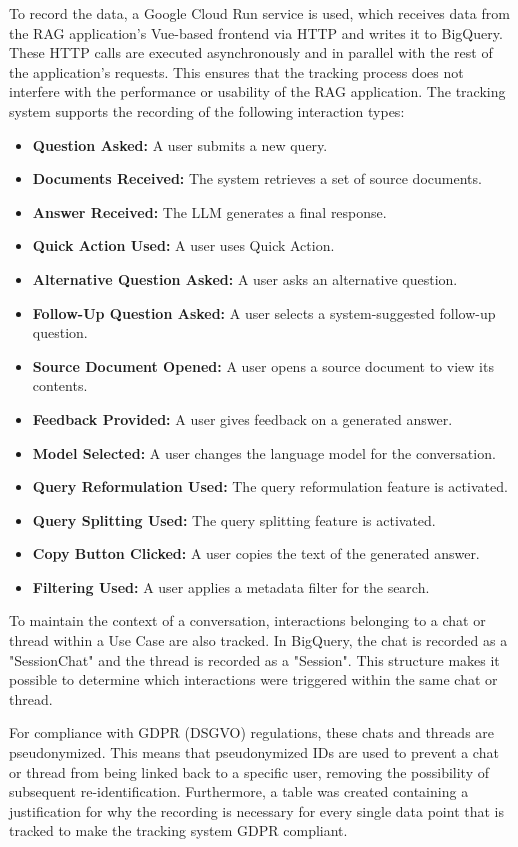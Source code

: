 \documentclass[
	english,
	ruledheaders=section,%
	class=report,%
	thesis={type=bachelor},%
	accentcolor=1b,%
	custommargins=true,%
	marginpar=false,%
	parskip=half-,%
	fontsize=11pt,%
	DIV=14,
]{tudapub}
\begin{document}
To record the data, a Google Cloud Run service is used, which receives data from the RAG application's Vue-based frontend via HTTP and writes it to BigQuery. These HTTP calls are executed asynchronously and in parallel with the rest of the application's requests. This ensures that the tracking process does not interfere with the performance or usability of the RAG application. The tracking system supports the recording of the following interaction types:
\begin{itemize}
    \item \textbf{Question Asked:} A user submits a new query.
    \item \textbf{Documents Received:} The system retrieves a set of source documents.
    \item \textbf{Answer Received:} The LLM generates a final response.
    \item \textbf{Quick Action Used:} A user uses Quick Action.
    \item \textbf{Alternative Question Asked:} A user asks an alternative question.
    \item \textbf{Follow-Up Question Asked:} A user selects a system-suggested follow-up question.
    \item \textbf{Source Document Opened:} A user opens a source document to view its contents.
    \item \textbf{Feedback Provided:} A user gives feedback on a generated answer.
    \item \textbf{Model Selected:} A user changes the language model for the conversation.
    \item \textbf{Query Reformulation Used:} The query reformulation feature is activated.
    \item \textbf{Query Splitting Used:} The query splitting feature is activated.
    \item \textbf{Copy Button Clicked:} A user copies the text of the generated answer.
    \item \textbf{Filtering Used:} A user applies a metadata filter for the search.
\end{itemize}
To maintain the context of a conversation, interactions belonging to a chat or thread within a Use Case are also tracked. In BigQuery, the chat is recorded as a "SessionChat" and the thread is recorded as a "Session". This structure makes it possible to determine which interactions were triggered within the same chat or thread.

For compliance with GDPR (DSGVO) regulations, these chats and threads are pseudonymized. This means that pseudonymized IDs are used to prevent a chat or thread from being linked back to a specific user, removing the possibility of subsequent re-identification. Furthermore, a table was created containing a justification for why the recording is necessary for every single data point that is tracked to make the tracking system GDPR compliant.
\end{document}
